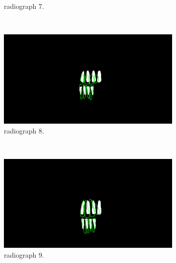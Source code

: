 \documentclass[a4paper,10pt]{article}
\begin{document}
\begin{figure}
\begin{subfigure}[b]{0.45\textwidth}
                \caption{ radiograph 7.}
                \label{fig:comp3}
        \end{subfigure}
        ~ %
        \begin{subfigure}[b]{0.45\textwidth}
                \includegraphics[width=\textwidth]{Images/segLand,8.jpg}
                \caption{ radiograph 8.}
                \label{fig:comp3}
        \end{subfigure}
        ~ %
        \begin{subfigure}[b]{0.45\textwidth}
                \includegraphics[width=\textwidth]{Images/segLand,9.jpg}
                \caption{ radiograph 9.}
                \label{fig:comp3}
        \end{subfigure}
        ~ %
        \begin{subfigure}[b]{0.45\textwidth}

\end{subfigure}
\end{figure}
\end{document}

